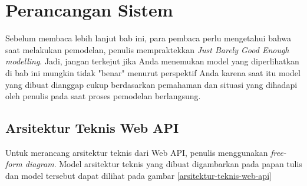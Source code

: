 \documentclass[a4paper, 12pt, oneside]{report}
\begin{document}
\chapter{Perancangan Sistem}

\onehalfspacing Sebelum membaca lebih lanjut bab ini, para pembaca perlu mengetahui bahwa saat melakukan pemodelan, penulis mempraktekkan \textit{Just Barely Good Enough modelling}\cite{jbge-scott}. Jadi, jangan terkejut jika Anda menemukan model yang diperlihatkan di bab ini mungkin tidak "benar" menurut perspektif Anda karena saat itu model yang dibuat dianggap cukup berdasarkan pemahaman dan situasi yang dihadapi oleh penulis pada saat proses pemodelan berlangsung.

\section{Arsitektur Teknis Web API}

Untuk merancang arsitektur teknis dari Web API, penulis menggunakan \textit{free-form diagram}. Model arsitektur teknis yang dibuat digambarkan pada papan tulis dan model tersebut dapat dilihat pada gambar \ref{arsitektur-teknis-web-api}

\newpage
\end{document}
